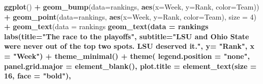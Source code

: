 \documentclass[
]{book}
\newenvironment{Shaded}{\begin{snugshade}}{\end{snugshade}}
\newcommand{\DataTypeTok}[1]{\textcolor[rgb]{0.13,0.29,0.53}{#1}}
\newcommand{\DecValTok}[1]{\textcolor[rgb]{0.00,0.00,0.81}{#1}}
\newcommand{\FloatTok}[1]{\textcolor[rgb]{0.00,0.00,0.81}{#1}}
\newcommand{\KeywordTok}[1]{\textcolor[rgb]{0.13,0.29,0.53}{\textbf{#1}}}
\newcommand{\NormalTok}[1]{#1}
\newcommand{\OperatorTok}[1]{\textcolor[rgb]{0.81,0.36,0.00}{\textbf{#1}}}
\newcommand{\StringTok}[1]{\textcolor[rgb]{0.31,0.60,0.02}{#1}}
\begin{document}
\begin{Shaded}
\begin{Highlighting}[]
\KeywordTok{ggplot}\NormalTok{() }\OperatorTok{+}\StringTok{ }
\StringTok{  }\KeywordTok{geom_bump}\NormalTok{(}\DataTypeTok{data=}\NormalTok{rankings, }\KeywordTok{aes}\NormalTok{(}\DataTypeTok{x=}\NormalTok{Week, }\DataTypeTok{y=}\NormalTok{Rank, }\DataTypeTok{color=}\NormalTok{Team)) }\OperatorTok{+}\StringTok{ }
\StringTok{  }\KeywordTok{geom_point}\NormalTok{(}\DataTypeTok{data=}\NormalTok{rankings, }\KeywordTok{aes}\NormalTok{(}\DataTypeTok{x=}\NormalTok{Week, }\DataTypeTok{y=}\NormalTok{Rank, }\DataTypeTok{color=}\NormalTok{Team), }\DataTypeTok{size =} \DecValTok{4}\NormalTok{) }\OperatorTok{+}\StringTok{   }
\StringTok{  }\KeywordTok{geom_text}\NormalTok{(}\DataTypeTok{data =}\NormalTok{ rankings }\OperatorTok{%
\StringTok{  }\KeywordTok{geom_text}\NormalTok{(}\DataTypeTok{data =}\NormalTok{ rankings }\OperatorTok{%
\StringTok{  }\KeywordTok{labs}\NormalTok{(}\DataTypeTok{title=}\StringTok{"The race to the playoffs"}\NormalTok{, }\DataTypeTok{subtitle=}\StringTok{"LSU and Ohio State were never out of the top two spots. LSU deserved it."}\NormalTok{, }\DataTypeTok{y=} \StringTok{"Rank"}\NormalTok{, }\DataTypeTok{x =} \StringTok{"Week"}\NormalTok{) }\OperatorTok{+}
\StringTok{  }\KeywordTok{theme_minimal}\NormalTok{() }\OperatorTok{+}
\StringTok{  }\KeywordTok{theme}\NormalTok{(}
    \DataTypeTok{legend.position =} \StringTok{"none"}\NormalTok{,}
    \DataTypeTok{panel.grid.major =} \KeywordTok{element_blank}\NormalTok{(),}
    \DataTypeTok{plot.title =} \KeywordTok{element_text}\NormalTok{(}\DataTypeTok{size =} \DecValTok{16}\NormalTok{, }\DataTypeTok{face =} \StringTok{"bold"}\NormalTok{),}
}}
\end{Highlighting}
\end{Shaded}
\end{document}

